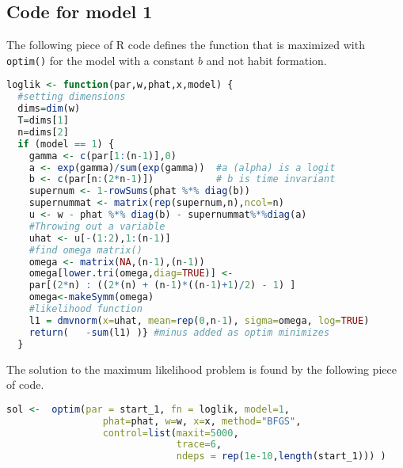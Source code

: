 \subsection{Code for model 1}\label{codelikfunction}
The following piece of R code defines the function that is maximized with \texttt{optim()} for the model with a constant $b$ and not habit formation.
\begin{lstlisting}[language=R]
 loglik <- function(par,w,phat,x,model) {
  #setting dimensions
  dims=dim(w)
  T=dims[1]
  n=dims[2]
  if (model == 1) { 
    gamma <- c(par[1:(n-1)],0)  
    a <- exp(gamma)/sum(exp(gamma))  #a (alpha) is a logit
    b <- c(par[n:(2*n-1)])           # b is time invariant
    supernum <- 1-rowSums(phat %*% diag(b))
    supernummat <- matrix(rep(supernum,n),ncol=n)
    u <- w - phat %*% diag(b) - supernummat%*%diag(a)
    #Throwing out a variable
    uhat <- u[-(1:2),1:(n-1)]
    #find omega matrix()
    omega <- matrix(NA,(n-1),(n-1))
    omega[lower.tri(omega,diag=TRUE)] <- 
    par[(2*n) : ((2*(n) + (n-1)*((n-1)+1)/2) - 1) ]
    omega<-makeSymm(omega)
    #likelihood function
    l1 = dmvnorm(x=uhat, mean=rep(0,n-1), sigma=omega, log=TRUE)
    return(   -sum(l1) )} #minus added as optim minimizes
  }
\end{lstlisting}

The solution to the maximum likelihood problem is found by the following piece of code.
\begin{lstlisting}[language=R]
 sol <-  optim(par = start_1, fn = loglik, model=1, 
                 phat=phat, w=w, x=x, method="BFGS",
                 control=list(maxit=5000,
                              trace=6,
                              ndeps = rep(1e-10,length(start_1))) )
\end{lstlisting}